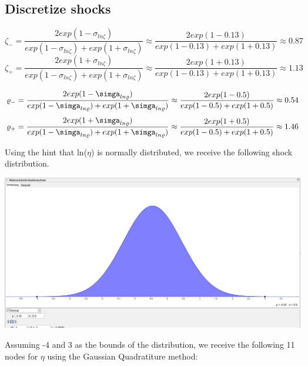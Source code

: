 \documentclass[12pt,a4paper]{article}
\begin{document}
\newpage
\subsection{Discretize shocks}
\vspace{1cm}
\begin{equation*}
    \zeta_-=\frac{2exp(1-\sigma_{ln\zeta})}{exp(1-\sigma_{ln\zeta})+exp(1+\sigma_{ln\zeta})}\approx\frac{2exp(1-0.13)}{exp(1-0.13)+exp(1+0.13)}\approx 0.87
    \end{equation*}
    \begin{equation*}
       \zeta_+=\frac{2exp(1+\sigma_{ln\zeta})}{exp(1-\sigma_{ln\zeta})+exp(1+\sigma_{ln\zeta})}\approx\frac{2exp(1+0.13)}{exp(1-0.13)+exp(1+0.13)}\approx 1.13
    \end{equation*}

\vspace{1cm}
\begin{equation*}
    \varrho_-=\frac{2exp(1-\simga_{ln\varrho})}{exp(1-\simga_{ln\varrho})+exp(1+\simga_{ln\varrho})}\approx\frac{2exp(1-0.5)}{exp(1-0.5)+exp(1+0.5)}\approx 0.54
    \end{equation*}
    \begin{equation*}
       \varrho_+=\frac{2exp(1+\simga_{ln\varrho})}{exp(1-\simga_{ln\varrho})+exp(1+\simga_{ln\varrho})}\approx\frac{2exp(1+0.5)}{exp(1-0.5)+exp(1+0.5)}\approx 1.46
    \end{equation*}

\vspace{1cm}
Using the hint that ln($\eta$) is normally distributed, we receive the following shock distribution.
\begin{center}
    \includegraphics[width=15cm]{eta_shocks.png}\\
\end{center}
Assuming -4 and 3 as the bounds of the distribution, we receive the following 11 nodes for $\eta$ using the Gaussian Quadratiture method: \\
\end{document}
